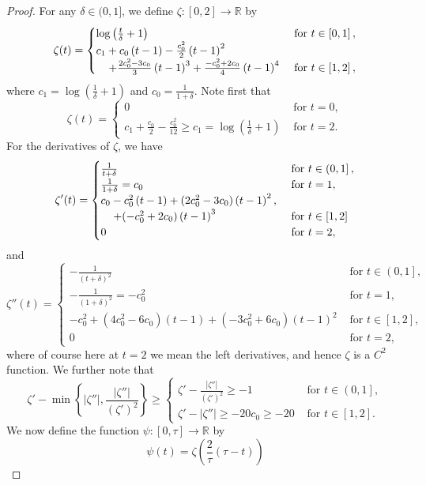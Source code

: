 \documentclass[11pt]{amsart}
\def\R{\mathbb{R}}
\def\d{\delta}
\begin{document}
\begin{proof}
For any $\d\in(0,1]$, we define $\zeta:[0,2]\to\R$ by
\[\zeta(t)=\begin{cases}\log\left(\frac{t}{\d}+1\right)&\text{ for  } t\in\left[0,1\right],\\
c_1+c_0\left(t-1\right)-\frac{c_0^2}{2}\left(t-1\right)^2\\
\hspace{.4cm}+\frac{2c_0^2-3c_0}{3}\left(t-1\right)^3+\frac{-c_0^2+2c_0}{4}\left(t-1\right)^4 &\text{ for  } t\in\left[1,2\right],
\end{cases}\]
where $c_1=\log\left(\frac1\d+1\right)$ and $c_0=\frac{1}{1+\d}$. Note first that
\[\zeta(t)=\begin{cases}0&\text{ for  } t=0,\\
c_1+\frac{c_0}{2}-\frac{c_0^2}{12}\ge c_1=\log\left(\frac1\d+1\right)&\text{ for  } t=2.
\end{cases}\]
For the derivatives of $\zeta$, we have
\[\zeta'(t)=\begin{cases}\frac{1}{t+\d}&\text{ for  } t\in\left(0,1\right],\\
\frac{1}{1+\d}=c_0&\text{ for  } t=1,\\
c_0-{c_0^2}\left(t-1\right)+({2c_0^2-3c_0})\left(t-1\right)^2,\\
\hspace{.4cm}+({-c_0^2+2c_0})\left(t-1\right)^3 &\text{ for  } t\in\left[1,2\right]\\
0&\text{ for  } t=2,
\end{cases}\]
and
\[\zeta''(t)=\begin{cases}-\frac{1}{(t+\d)^2}&\text{ for  } t\in\left(0,1\right],\\
-\frac{1}{(1+\d)^2}=-c_0^2&\text{ for  } t=1,\\
-{c_0^2}+({4c_0^2-6c_0})\left(t-1\right)+({-3c_0^2+6c_0})\left(t-1\right)^2 &\text{ for  } t\in\left[1,2\right],\\
0&\text{ for  } t=2,
\end{cases}\]
where of course here at $t=2$ we mean the  left derivatives, and hence $\zeta$ is a $C^2$ function. We further note that
\[\zeta'-\min\left\{|\zeta''|,\frac{|\zeta''|}{(\zeta')^2}\right\}\ge\begin{cases}\zeta' -\frac{|\zeta''|}{(\zeta')^2}\ge -1&\text{ for  } t\in\left(0,1\right],\\
 \zeta'-|\zeta''|\ge -20c_0\ge -20&\text{ for  } t\in\left[1,2\right].
 \end{cases}
\]
We now define the function $\psi:[0,\tau]\to\R$ by 
\[\psi(t)=\zeta\left(\frac{2}{\tau}(\tau-t)\right)\]

\end{proof}
\end{document}
